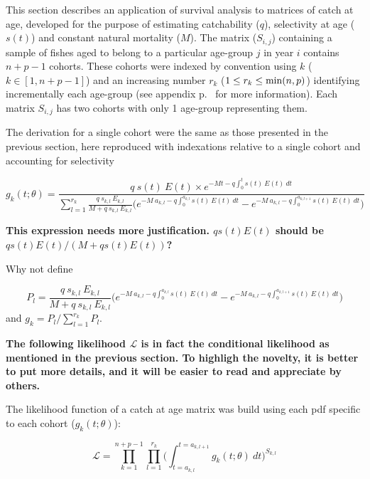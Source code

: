 This section describes an application of survival analysis to matrices of catch at age, developed for the purpose of estimating catchability ($q$), selectivity at age ($s(t)$) and constant natural mortality ($M$). The matrix ($S_{i,j}$) containing a sample of fishes aged to belong to a particular age-group $j$ in year $i$ contains $n+p-1$ cohorts. These cohorts were indexed by convention using $k$ ($k \in [1, n+p-1]$) and an increasing number $r_{k}$ ($ 1 \leq r_{k} \leq {\rm min}(n,p)$)
identifying incrementally each age-group (see appendix p.~\pageref{Appendix:DefinitionsOfMathematicalSymbols} for more information). Each matrix $S_{i,j}$ has two cohorts with only 1 age-group representing them.

The derivation for a single cohort were the same as those presented in the previous section, here reproduced with indexations relative to a single cohort and accounting for selectivity

\begin{equation}
g_{k}(t; \theta) = \frac{q \ s(t) \ E(t) \times e^{-Mt-q\int_{0}^{t} s(t) \ E(t) \ dt}} {\sum_{l=1}^{r_{k}} \frac{q \ s_{k,l} \ E_{k,l}}{M+q \ s_{k,l} \ E_{k,l}} \bigl ( e^{-M \ a_{k,l}-q\int_{0}^{a_{k,l}}s(t) \ E(t) \ dt} - e^{-M \ a_{k,l}-q\int_{0}^{a_{k,l+1}}s(t) \ E(t) \ dt} \bigr )}
\end{equation}

{\bf This expression needs more justification.  $qs(t)E(t)$ should be $q s(t)E(t) /(M+q s(t)E(t))$?

Why not define}

$$ 
 P_l = \frac{q \ s_{k,l} \ E_{k,l}}{M+q \ s_{k,l} \ E_{k,l}} \bigl ( e^{-M \ a_{k,l}-q\int_{0}^{a_{k,l}}s(t) \ E(t) \ dt} - e^{-M \ a_{k,l}-q\int_{0}^{a_{k,l+1}}s(t) \ E(t) \ dt} \bigr )
$$
and $g_k = P_l / \sum_{l=1}^{r_{k}} P_l$.


{\bf The following likelihood $\mathcal{L}$  is in fact the conditional  likelihood as mentioned in the previous section.  To highligh the novelty,  it is better to put more details,
and it will be easier to read and appreciate by others.}



The likelihood function of a catch at age matrix was build using each pdf specific to each cohort ($g_{k}(t; \theta)$):

\begin{equation}
\mathcal{L} = \prod_{k=1}^{n+p-1} \prod_{l=1}^{r_{k}}  \bigl ( \int_{t=a_{k,l}}^{t=a_{k,l+1}} g_{k}(t; \theta) \ dt \bigr ) ^ {S_{k,l}}
\end{equation}

